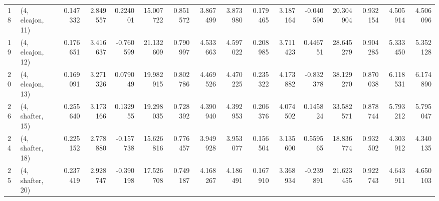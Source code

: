 \begin{tabular}{llrrrrrrrrrrrrrr}
18 &  (4, elcajon, 11) &   0.147332 &  2.849557 &  0.224001 &  15.007722 &  0.851572 &   3.867499 &  3.873980 &  0.179465 &  3.187164 & -0.040590 &   20.304904 &  0.932154 &   4.505914 &   4.506096 \\
19 &  (4, elcajon, 12) &   0.176651 &  3.416637 & -0.760599 &  21.132609 &  0.790997 &   4.533663 &  4.597022 &  0.208985 &  3.711423 &  0.446751 &   28.645279 &  0.904285 &   5.333450 &   5.352128 \\
20 &  (4, elcajon, 13) &   0.169091 &  3.271326 &  0.079049 &  19.982915 &  0.802786 &   4.469526 &  4.470225 &  0.235322 &  4.173882 & -0.832378 &   38.129270 &  0.870038 &   6.118531 &   6.174890 \\
26 &  (4, shafter, 15) &   0.255640 &  3.173166 &  0.132955 &  19.298035 &  0.728392 &   4.390940 &  4.392953 &  0.206376 &  4.074502 &  0.145824 &   33.582571 &  0.878744 &   5.793212 &   5.795047 \\
24 &  (4, shafter, 18) &   0.225152 &  2.778880 & -0.157738 &  15.626816 &  0.776457 &   3.949928 &  3.953077 &  0.156504 &  3.135600 &  0.559565 &   18.836774 &  0.932502 &   4.303912 &   4.340135 \\
25 &  (4, shafter, 20) &   0.237419 &  2.928747 & -0.390198 &  17.526708 &  0.749187 &   4.168267 &  4.186491 &  0.167910 &  3.368934 & -0.239891 &   21.623455 &  0.922743 &   4.643911 &   4.650103 \\
\bottomrule
\end{tabular}
